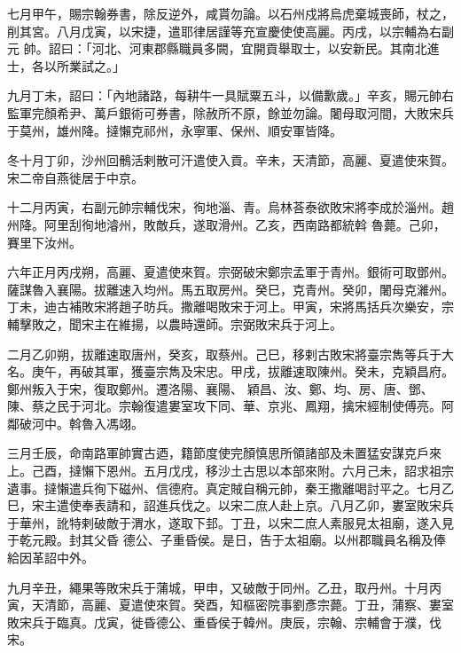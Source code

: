 \begin{pinyinscope}
 七月甲午，賜宗翰券書，除反逆外，咸貰勿論。以石州戍將烏虎棄城喪師，杖之，削其宮。八月戊寅，以宋捷，遣耶律居謹等充宣慶使使高麗。丙戌，以宗輔為右副元
 帥。詔曰：「河北、河東郡縣職員多闕，宜開貢舉取士，以安新民。其南北進士，各以所業試之。」



 九月丁未，詔曰：「內地諸路，每耕牛一具賦粟五斗，以備歉歲。」辛亥，賜元帥右監軍完顏希尹、萬戶銀術可券書，除赦所不原，餘並勿論。闍母取河間，大敗宋兵于莫州，雄州降。撻懶克祁州，永寧軍、保州、順安軍皆降。



 冬十月丁卯，沙州回鶻活剌散可汗遣使入貢。辛未，天清節，高麗、夏遣使來賀。宋二帝自燕徙居于中京。



 十二月丙寅，右副元帥宗輔伐宋，徇地淄、青。烏林荅泰欲敗宋將李成於淄州。趙州降。阿里刮徇地濬州，敗敵兵，遂取滑州。乙亥，西南路都統斡
 魯薨。己卯，賽里下汝州。



 六年正月丙戌朔，高麗、夏遣使來賀。宗弼破宋鄭宗孟軍于青州。銀術可取鄧州。薩謀魯入襄陽。拔離速入均州。馬五取房州。癸巳，克青州。癸卯，闍母克濰州。丁未，迪古補敗宋將趙子昉兵。撒離喝敗宋于河上。甲寅，宋將馬括兵次樂安，宗輔擊敗之，聞宋主在維揚，以農時還師。宗弼敗宋兵于河上。



 二月乙卯朔，拔離速取唐州，癸亥，取蔡州。己巳，移剌古敗宋將臺宗雋等兵于大名。庚午，再破其軍，獲臺宗雋及宋忠。甲戌，拔離速取陳州。癸未，克穎昌府。鄭州叛入于宋，復取鄭州。遷洛陽、襄陽、
 穎昌、汝、鄭、均、房、唐、鄧、陳、蔡之民于河北。宗翰復遣婁室攻下同、華、京兆、鳳翔，擒宋經制使傅亮。阿鄰破河中。斡魯入馮翊。



 三月壬辰，命南路軍帥實古迺，籍節度使完顏慎思所領諸部及未置猛安謀克戶來上。己酉，撻懶下恩州。五月戊戌，移沙土古思以本部來附。六月己未，詔求祖宗遺事。撻懶遣兵徇下磁州、信德府。真定賊自稱元帥，秦王撒離喝討平之。七月乙巳，宋主遣使奉表請和，詔進兵伐之。以宋二庶人赴上京。八月乙卯，婁室敗宋兵于華州，訛特剌破敵于渭水，遂取下邽。丁丑，以宋二庶人素服見太祖廟，遂入見于乾元殿。封其父昏
 德公、子重昏侯。是日，告于太祖廟。以州郡職員名稱及俸給因革詔中外。



 九月辛丑，繩果等敗宋兵于蒲城，甲申，又破敵于同州。乙丑，取丹州。十月丙寅，天清節，高麗、夏遣使來賀。癸酉，知樞密院事劉彥宗薨。丁丑，蒲察、婁室敗宋兵于臨真。戊寅，徙昏德公、重昏侯于韓州。庚辰，宗翰、宗輔會于濮，伐宋。




\end{pinyinscope}

